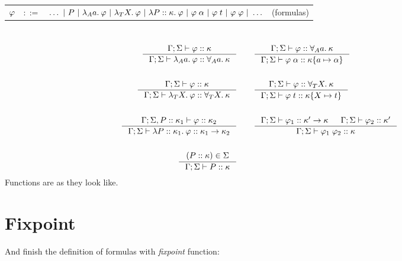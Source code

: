 \documentclass[english, mgr]{iithesis}
\renewcommand{\it}[1]{\textit{#1}}
\begin{document}
\begin{tabular}{rrlr}
$\varphi$ & $::=$ & $\ldots
               \ |\  P
               \ |\  \lambda_A a .\: \varphi
               \ |\  \lambda_T X .\: \varphi
               \ |\  \lambda P :: \kappa.\: \varphi
               \ |\  \varphi \;\alpha
               \ |\  \varphi \;t
               \ |\  \varphi \; \varphi
               \ |\  \ldots$
    & (formulas)
\end{tabular}\\
\begin{align*}
\inference{
  \cEnv; \kEnv \vdash \formphi \ofkind \kind
}{
  \cEnv; \kEnv \vdash \fLamAtom{\atomv} \formphi \ofkind \kForallAtom{\atomv}\kind
}
& \qquad
\inference{
  \cEnv;\kEnv\vdash \formphi \ofkind \kForallAtom{\atomv}\kind
}{
  \cEnv;\kEnv\vdash \formphi \fAppAtom{\atomexp} \ofkind \kind \subst{\atomv}{\atomexp}
}
\\ & \\
\inference{
  \cEnv; \kEnv \vdash \formphi \ofkind \kind
}{
  \cEnv; \kEnv \vdash \fLamTerm{\termv} \formphi \ofkind \kForallTerm{\termv}\kind
}
& \qquad
\inference{
  \cEnv;\kEnv\vdash \formphi \ofkind \kForallTerm{\termv}\kind
}{
  \cEnv;\kEnv\vdash \formphi \fAppTerm{\term} \ofkind \kind\subst{\termv}{\term}
}
\\ & \\
\inference{
  \cEnv; \kEnv, \propv \ofkind \kind_1 \vdash \formphi \ofkind \kind_2
}{
  \cEnv; \kEnv \vdash \fLamForm{\propv}{\kind_1} \formphi \ofkind \kind_1 \karrow \kind_2
}
& \qquad
\inference{
  \cEnv; \kEnv \vdash \formphi_1 \ofkind \kind' \karrow \kind &
  \cEnv; \kEnv \vdash \formphi_2 \ofkind \kind'
}{
  \cEnv;\kEnv\vdash \formphi_1 \fApp \formphi_2 \ofkind \kind
}
\\ & \\
\inference{
  (\propv \ofkind \kind) \in \kEnv
}{
  \cEnv; \kEnv \vdash  \propv \ofkind \kind
}
&
\end{align*}
Functions are as they look like.

\section{Fixpoint}
\newcommand{\fix}[3]{\ensuremath{\text{fix }#1(#2)\ofkind#3=}}
And finish the definition of formulas with \it{fixpoint} function:
\end{document}

